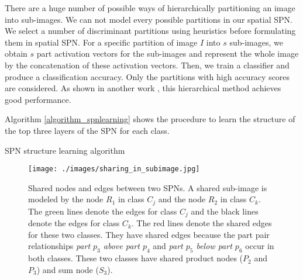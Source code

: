 \documentclass[journal]{IEEEtran}
\begin{document}
There are a huge number of possible ways of hierarchically partitioning an image into sub-images. We can not model every possible partitions in our spatial SPN. We select a number of discriminant partitions using heuristics before formulating them in spatial SPN. For a specific partition of image $ I $ into $ s $ sub-images, we obtain $ s $ part activation vectors for the sub-images and represent the whole image by the concatenation of these activation vectors. Then, we train a classifier and produce a classification accuracy. Only the partitions with high accuracy scores are considered. As shown in another work \cite{Wang2015Video}, this hierarchical method achieves good performance.











Algorithm \ref{algorithm_spnlearning} shows the procedure to learn the structure of the top three layers of the SPN for each class.



\begin{algorithm}[h]
	\caption{SPN structure learning algorithm}
	\label{algorithm_spnlearning}
\end{algorithm}




\begin{figure}[htb]
	\begin{center}
		\texttt{[image: ./images/sharing\_in\_subimage.jpg]}
	\end{center}
	\caption{Shared nodes and edges between two SPNs. A shared sub-image is modeled by the node $ R_1 $ in class $ C_j $ and the node $ R_2 $ in class $ C_k $. The green lines denote the edges for class $ C_j $ and the black lines denote the edges for class $ C_k $. The red lines denote the shared edges for these two classes. They have shared edges because the part pair relationships \textit{part $ p_3 $ above part $ p_4 $} and \textit{part $ p_5 $ below part $ p_6 $} occur in both classes. These two classes have shared product nodes ($ P_2 $ and $ P_3 $) and sum node ($ S_3 $).}
	\label{fig:sharing_in_subimage}
\end{figure}
\end{document}
